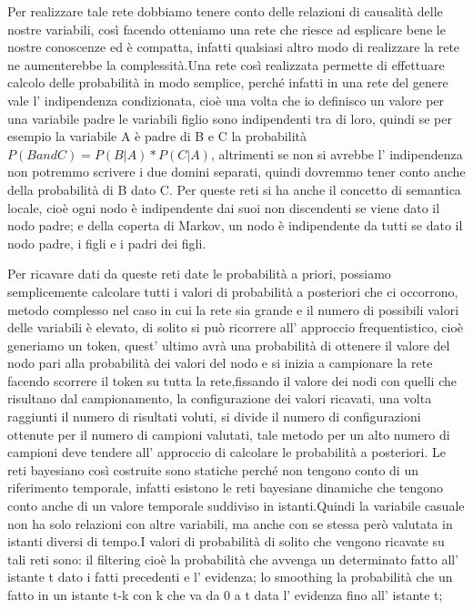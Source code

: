 		Per realizzare tale rete dobbiamo tenere conto delle relazioni di causalità delle nostre variabili, così facendo otteniamo una rete che riesce ad esplicare bene le nostre conoscenze ed è compatta, infatti qualsiasi altro modo di realizzare la rete ne aumenterebbe la complessità.Una rete così realizzata permette di effettuare calcolo delle probabilità in modo semplice, perché infatti in una rete del genere vale l' indipendenza condizionata, cioè una volta che io definisco un valore per una variabile padre le variabili figlio sono indipendenti tra di loro, quindi se per esempio la variabile A è padre di B e C la probabilità $P(B and C)=P(B|A)*P(C|A)$, altrimenti se non si avrebbe l' indipendenza non potremmo scrivere i due domini separati, quindi dovremmo tener conto anche della probabilità di B dato C. Per queste reti si ha anche il concetto di semantica locale, cioè ogni nodo è indipendente dai suoi non discendenti se viene dato il nodo padre; e della coperta di Markov, un nodo è indipendente da tutti se dato il nodo padre, i figli e i padri dei figli.
		\par  
		Per ricavare dati da queste reti date le probabilità a priori, possiamo semplicemente calcolare tutti i valori di probabilità a posteriori che ci occorrono, metodo complesso nel caso in cui la rete sia grande e il numero di possibili valori delle variabili è elevato, di solito si può ricorrere all' approccio frequentistico, cioè generiamo un token, quest' ultimo avrà una probabilità di ottenere il valore del nodo pari alla probabilità dei valori del nodo e si inizia a campionare la rete facendo scorrere il token su tutta la rete,fissando il valore dei nodi con quelli che risultano dal campionamento, la configurazione dei valori ricavati, una volta raggiunti il numero di risultati voluti, si divide il numero di configurazioni ottenute per il numero di campioni valutati, tale metodo per un alto numero di campioni deve tendere all' approccio di calcolare le probabilità a posteriori. Le reti bayesiano così costruite sono statiche perché non tengono conto di un riferimento temporale, infatti esistono le reti bayesiane dinamiche che tengono conto anche di un valore temporale suddiviso in istanti.Quindi la variabile casuale non ha solo relazioni con altre variabili, ma anche con se stessa però valutata in istanti diversi di tempo.I valori di probabilità di solito che vengono ricavate su tali reti sono: il filtering cioè la probabilità che avvenga un determinato fatto all' istante t dato i fatti precedenti e l' evidenza; lo smoothing la probabilità che un fatto in un istante t-k con k che va da 0 a t data l' evidenza fino all' istante t;
